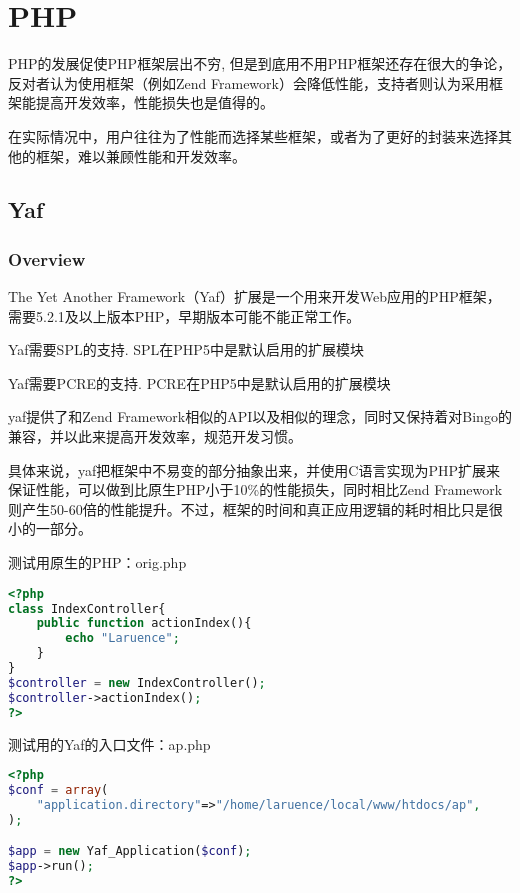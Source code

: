 \chapter{PHP}


PHP的发展促使PHP框架层出不穷, 但是到底用不用PHP框架还存在很大的争论，反对者认为使用框架（例如Zend Framework）会降低性能，支持者则认为采用框架能提高开发效率，性能损失也是值得的。

在实际情况中，用户往往为了性能而选择某些框架，或者为了更好的封装来选择其他的框架，难以兼顾性能和开发效率。



\section{Yaf}


\subsection{Overview}


The Yet Another Framework（Yaf）扩展是一个用来开发Web应用的PHP框架，需要5.2.1及以上版本PHP，早期版本可能不能正常工作。

\begin{compactitem}
\item Yaf需要SPL的支持. SPL在PHP5中是默认启用的扩展模块
\item Yaf需要PCRE的支持. PCRE在PHP5中是默认启用的扩展模块
\end{compactitem}

yaf提供了和Zend Framework相似的API以及相似的理念，同时又保持着对Bingo的兼容，并以此来提高开发效率，规范开发习惯。

具体来说，yaf把框架中不易变的部分抽象出来，并使用C语言实现为PHP扩展来保证性能，可以做到比原生PHP小于10\%的性能损失，同时相比Zend Framework则产生50-60倍的性能提升。不过，框架的时间和真正应用逻辑的耗时相比只是很小的一部分。


测试用原生的PHP：orig.php

\begin{lstlisting}[language=PHP]
<?php
class IndexController{
	public function actionIndex(){
		echo "Laruence";
	}
}
$controller = new IndexController();
$controller->actionIndex();
?>
\end{lstlisting}

测试用的Yaf的入口文件：ap.php

\begin{lstlisting}[language=PHP]
<?php
$conf = array(
	"application.directory"=>"/home/laruence/local/www/htdocs/ap",
);

$app = new Yaf_Application($conf);
$app->run();
?>
\end{lstlisting}

